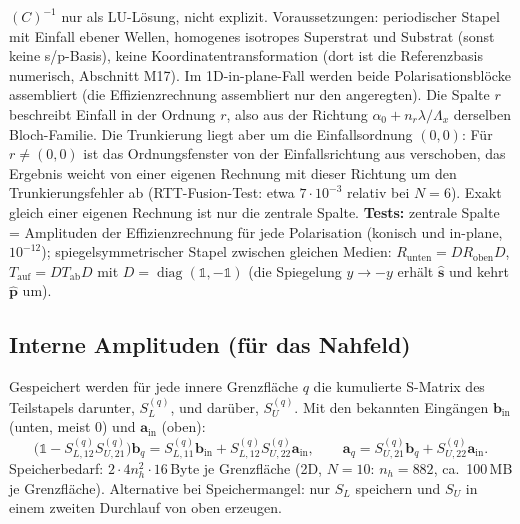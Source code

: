 $(C)^{-1}$ nur als LU-Lösung, nicht explizit. Voraussetzungen: periodischer Stapel mit Einfall ebener Wellen,
homogenes isotropes Superstrat und Substrat (sonst keine s/p-Basis), keine Koordinatentransformation
(dort ist die Referenzbasis numerisch, Abschnitt M17). Im 1D-in-plane-Fall werden beide Polarisationsblöcke
assembliert (die Effizienzrechnung assembliert nur den angeregten). Die Spalte $r$ beschreibt Einfall in der
Ordnung $r$, also aus der Richtung $\alpha_0+n_r\lambda/\Lambda_x$ derselben Bloch-Familie. Die Trunkierung
liegt aber um die Einfallsordnung $(0,0)$: Für $r\neq(0,0)$ ist das Ordnungsfenster von der Einfallsrichtung aus
verschoben, das Ergebnis weicht von einer eigenen Rechnung mit dieser Richtung um den Trunkierungsfehler ab
(RTT-Fusion-Test: etwa $7\cdot10^{-3}$ relativ bei $N=6$). Exakt gleich einer eigenen Rechnung ist nur die
zentrale Spalte.
\textbf{Tests:} zentrale Spalte = Amplituden der Effizienzrechnung für jede Polarisation (konisch und
in-plane, $10^{-12}$); spiegelsymmetrischer Stapel zwischen gleichen Medien: $R_{\text{unten}}=DR_{\text{oben}}D$,
$T_{\text{auf}}=DT_{\text{ab}}D$ mit $D=\operatorname{diag}(\mathbb 1,-\mathbb 1)$ (die Spiegelung $y\to-y$ erhält
$\hat{\mathbf s}$ und kehrt $\hat{\mathbf p}$ um).

\subsection{Interne Amplituden (für das Nahfeld)}
Gespeichert werden für jede innere Grenzfläche $q$ die kumulierte S-Matrix des Teilstapels darunter,
$S_L^{(q)}$, und darüber, $S_U^{(q)}$. Mit den bekannten Eingängen $\mathbf b_{\text{in}}$ (unten, meist 0)
und $\mathbf a_{\text{in}}$ (oben):
\begin{equation}
  \big(\mathbb 1-S^{(q)}_{L,12}S^{(q)}_{U,21}\big)\mathbf b_q=S^{(q)}_{L,11}\mathbf b_{\text{in}}+S^{(q)}_{L,12}S^{(q)}_{U,22}\mathbf a_{\text{in}},\qquad
  \mathbf a_q=S^{(q)}_{U,21}\mathbf b_q+S^{(q)}_{U,22}\mathbf a_{\text{in}} .
  \label{eq:internal}
\end{equation}
Speicherbedarf: $2\cdot4n_h^2\cdot16$\,Byte je Grenzfläche (2D, $N=10$: $n_h=882$, ca.\ 100\,MB je
Grenzfläche). Alternative bei Speichermangel: nur $S_L$ speichern und $S_U$ in einem zweiten Durchlauf
von oben erzeugen.
